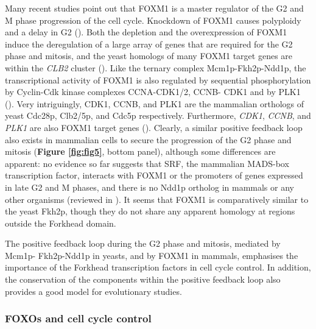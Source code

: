 Many recent studies point out that FOXM1 is a master regulator of the G2 and M phase progression of the cell cycle. Knockdown of FOXM1 causes polyploidy and a delay in G2 (\cite{laoukili2005foxm1}). Both the depletion and the overexpression of FOXM1 induce the deregulation of a large array of genes that are required for the G2 phase and mitosis, and the yeast homologs of many FOXM1 target genes are within the \textit{CLB2} cluster (\cite{laoukili2005foxm1,wonsey2005loss,lefebvre2010a}). Like the ternary complex Mcm1p-Fkh2p-Ndd1p, the transcriptional activity of FOXM1 is also regulated by sequential phosphorylation by Cyclin-Cdk kinase complexes CCNA-CDK1/2, CCNB- CDK1 and by PLK1 (\cite{wang2005forkhead,fu2008plk1-dependent,laoukili2008activation}). Very intriguingly, CDK1, CCNB, and PLK1 are the mammalian orthologs of yeast Cdc28p, Clb2/5p, and Cdc5p respectively. Furthermore, \textit{CDK1}, \textit{CCNB}, and \textit{PLK1} are also FOXM1 target genes (\cite{laoukili2005foxm1,wang2005forkhead}). Clearly, a similar positive feedback loop also exists in mammalian cells to secure the progression of the G2 phase and mitosis (\textbf{Figure \ref{fig:fig5}}, bottom panel), although some differences are apparent: no evidence so far suggests that SRF, the mammalian MADS-box transcription factor, interacts with FOXM1 or the promoters of genes expressed in late G2 and M phases, and there is no Ndd1p ortholog in mammals or any other organisms (reviewed in \cite{murakami2010regulation}). It seems that FOXM1 is comparatively similar to the yeast Fkh2p, though they do not share any apparent homology at regions outside the Forkhead domain.

The positive feedback loop during the G2 phase and mitosis, mediated by Mcm1p- Fkh2p-Ndd1p in yeasts, and by FOXM1 in mammals, emphasises the importance of the Forkhead transcription factors in cell cycle control. In addition, the conservation of the components within the positive feedback loop also provides a good model for evolutionary studies.

\subsubsection{FOXOs and cell cycle control}

